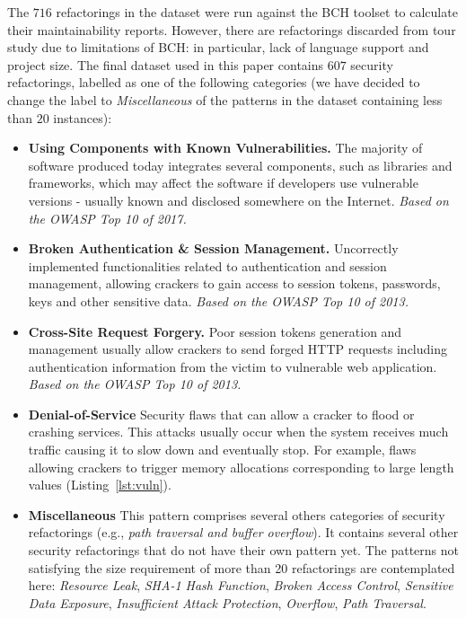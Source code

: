 \documentclass[10pt,conference]{IEEEtran}
\begin{document}
The $716$ refactorings in the dataset were run against the BCH toolset to
calculate their maintainability reports. However, there are refactorings
discarded from tour study due to limitations of BCH: in particular, lack of
language support and project size. The final dataset used in this paper contains
$607$ security refactorings, labelled as one of the following categories (we
have decided to change the label to \textit{Miscellaneous} of the patterns in
the dataset containing less than $20$ instances):

\begin{itemize}
	\item \textbf{Using Components with Known Vulnerabilities.} The majority of
	software produced today integrates several components, such as libraries and
	frameworks, which may affect the software if developers use vulnerable
	versions - usually known and disclosed somewhere on the Internet.
	\textit{Based on the OWASP Top 10 of 2017.}

	\item \textbf{Broken Authentication \& Session Management.} Uncorrectly
	implemented functionalities related to authentication and session management,
	allowing crackers to gain access to session tokens, passwords, keys and other
	sensitive data. \textit{Based on the OWASP Top 10 of 2013.}

	\item \textbf{Cross-Site Request Forgery.} Poor session tokens generation and
	management usually allow crackers to send forged HTTP requests including
	authentication information from the victim to vulnerable web application.
	\textit{Based on the OWASP Top 10 of 2013.}

	\item \textbf{Denial-of-Service} Security flaws that can allow a cracker to
	flood or crashing services. This attacks usually occur when the system
	receives much traffic causing it to slow down and eventually stop. For
	example, flaws allowing crackers to trigger memory allocations corresponding
	to large length values (Listing~\ref{lst:vuln}).

	\item \textbf{Miscellaneous} This pattern comprises several others categories
	of security refactorings (e.g., \textit{path traversal and buffer overflow}).
	It contains several other security refactorings that do not have their own
	pattern yet. The patterns not satisfying the size requirement of more than 20
	refactorings are contemplated here: \textit{Resource Leak},
	\textit{SHA-1 Hash Function}, \textit{Broken Access Control}, \textit{Sensitive Data Exposure},
	\textit{Insufficient Attack Protection}, \textit{Overflow}, \textit{Path Traversal}.


\end{itemize}
\end{document}
